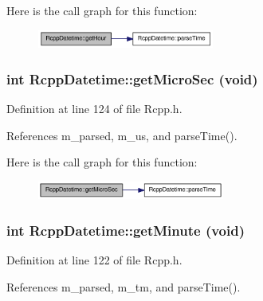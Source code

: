 Here is the call graph for this function:\nopagebreak
\begin{figure}[H]
\begin{center}
\leavevmode
\includegraphics[width=164pt]{classRcppDatetime_a0da8db1ecd235a6e7ab309e70e4e93b0_cgraph}
\end{center}
\end{figure}
\hypertarget{classRcppDatetime_acdf9e19f28c84fde38c352df5f225999}{
\subsubsection[{getMicroSec}]{\setlength{\rightskip}{0pt plus 5cm}int RcppDatetime::getMicroSec (void)}}
\label{classRcppDatetime_acdf9e19f28c84fde38c352df5f225999}


Definition at line 124 of file Rcpp.h.

References m\_\-parsed, m\_\-us, and parseTime().

Here is the call graph for this function:\nopagebreak
\begin{figure}[H]
\begin{center}
\leavevmode
\includegraphics[width=174pt]{classRcppDatetime_acdf9e19f28c84fde38c352df5f225999_cgraph}
\end{center}
\end{figure}
\hypertarget{classRcppDatetime_adb41bd524ead66d69e129b1f2767358a}{
\subsubsection[{getMinute}]{\setlength{\rightskip}{0pt plus 5cm}int RcppDatetime::getMinute (void)}}
\label{classRcppDatetime_adb41bd524ead66d69e129b1f2767358a}


Definition at line 122 of file Rcpp.h.

References m\_\-parsed, m\_\-tm, and parseTime().

